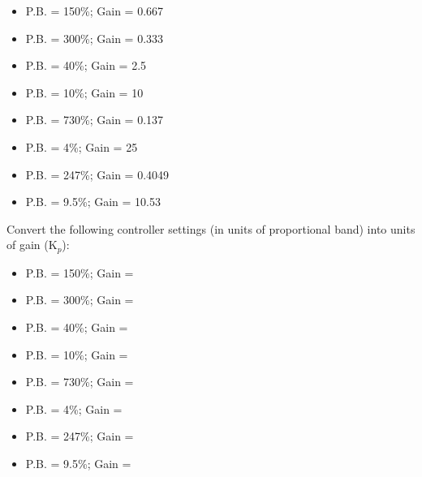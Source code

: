 \begin{itemize}
\item{}P.B. = 150\%; Gain = 0.667
\vskip 5pt
\item{}P.B. = 300\%; Gain = 0.333
\vskip 5pt
\item{}P.B. = 40\%; Gain = 2.5
\vskip 5pt
\item{}P.B. = 10\%; Gain = 10
\vskip 5pt
\item{}P.B. = 730\%; Gain = 0.137
\vskip 5pt
\item{}P.B. = 4\%; Gain = 25
\vskip 5pt
\item{}P.B. = 247\%; Gain = 0.4049
\vskip 5pt
\item{}P.B. = 9.5\%; Gain = 10.53
\end{itemize} 














Convert the following controller settings (in units of proportional band) into units of gain (K$_{p}$):

\begin{itemize}
\item{}P.B. = 150\%; Gain = \underbar{\hskip 50pt}
\vskip 5pt
\item{}P.B. = 300\%; Gain = \underbar{\hskip 50pt} 
\vskip 5pt
\item{}P.B. = 40\%; Gain = \underbar{\hskip 50pt} 
\vskip 5pt
\item{}P.B. = 10\%; Gain = \underbar{\hskip 50pt} 
\vskip 5pt
\item{}P.B. = 730\%; Gain = \underbar{\hskip 50pt} 
\vskip 5pt
\item{}P.B. = 4\%; Gain = \underbar{\hskip 50pt} 
\vskip 5pt
\item{}P.B. = 247\%; Gain = \underbar{\hskip 50pt} 
\vskip 5pt
\item{}P.B. = 9.5\%; Gain = \underbar{\hskip 50pt} 
\end{itemize} 

